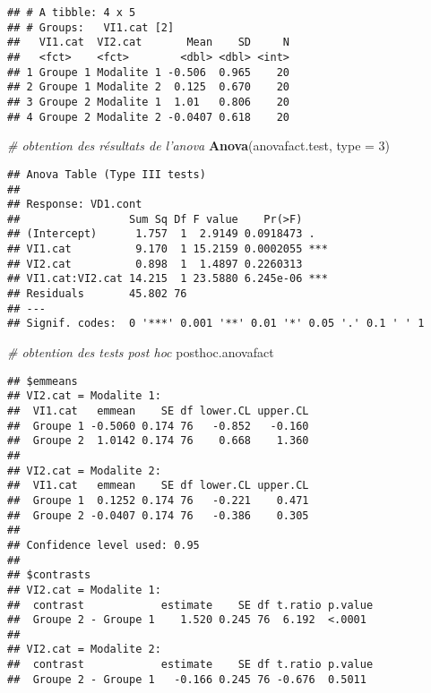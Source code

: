 \documentclass[
]{book}
\newenvironment{Shaded}{\begin{snugshade}}{\end{snugshade}}
\newcommand{\CommentTok}[1]{\textcolor[rgb]{0.56,0.35,0.01}{\textit{#1}}}
\newcommand{\DataTypeTok}[1]{\textcolor[rgb]{0.13,0.29,0.53}{#1}}
\newcommand{\DecValTok}[1]{\textcolor[rgb]{0.00,0.00,0.81}{#1}}
\newcommand{\KeywordTok}[1]{\textcolor[rgb]{0.13,0.29,0.53}{\textbf{#1}}}
\newcommand{\NormalTok}[1]{#1}
\begin{document}
\begin{verbatim}
## # A tibble: 4 x 5
## # Groups:   VI1.cat [2]
##   VI1.cat  VI2.cat       Mean    SD     N
##   <fct>    <fct>        <dbl> <dbl> <int>
## 1 Groupe 1 Modalite 1 -0.506  0.965    20
## 2 Groupe 1 Modalite 2  0.125  0.670    20
## 3 Groupe 2 Modalite 1  1.01   0.806    20
## 4 Groupe 2 Modalite 2 -0.0407 0.618    20
\end{verbatim}

\begin{Shaded}
\begin{Highlighting}[]
\CommentTok{# obtention des résultats de l'anova }
\KeywordTok{Anova}\NormalTok{(anovafact.test, }\DataTypeTok{type =} \DecValTok{3}\NormalTok{)}
\end{Highlighting}
\end{Shaded}

\begin{verbatim}
## Anova Table (Type III tests)
## 
## Response: VD1.cont
##                 Sum Sq Df F value    Pr(>F)    
## (Intercept)      1.757  1  2.9149 0.0918473 .  
## VI1.cat          9.170  1 15.2159 0.0002055 ***
## VI2.cat          0.898  1  1.4897 0.2260313    
## VI1.cat:VI2.cat 14.215  1 23.5880 6.245e-06 ***
## Residuals       45.802 76                      
## ---
## Signif. codes:  0 '***' 0.001 '**' 0.01 '*' 0.05 '.' 0.1 ' ' 1
\end{verbatim}

\begin{Shaded}
\begin{Highlighting}[]
\CommentTok{# obtention des tests post hoc }
\NormalTok{posthoc.anovafact}
\end{Highlighting}
\end{Shaded}

\begin{verbatim}
## $emmeans
## VI2.cat = Modalite 1:
##  VI1.cat   emmean    SE df lower.CL upper.CL
##  Groupe 1 -0.5060 0.174 76   -0.852   -0.160
##  Groupe 2  1.0142 0.174 76    0.668    1.360
## 
## VI2.cat = Modalite 2:
##  VI1.cat   emmean    SE df lower.CL upper.CL
##  Groupe 1  0.1252 0.174 76   -0.221    0.471
##  Groupe 2 -0.0407 0.174 76   -0.386    0.305
## 
## Confidence level used: 0.95 
## 
## $contrasts
## VI2.cat = Modalite 1:
##  contrast            estimate    SE df t.ratio p.value
##  Groupe 2 - Groupe 1    1.520 0.245 76  6.192  <.0001 
## 
## VI2.cat = Modalite 2:
##  contrast            estimate    SE df t.ratio p.value
##  Groupe 2 - Groupe 1   -0.166 0.245 76 -0.676  0.5011
\end{verbatim}
\end{document}
